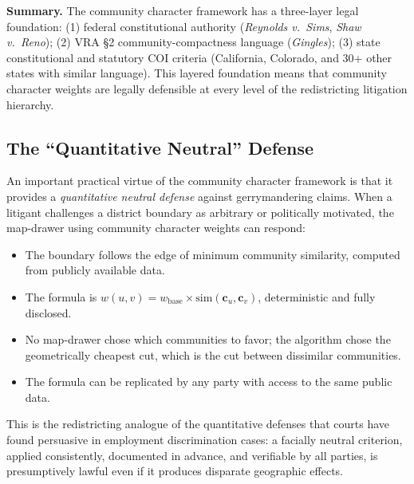 \textbf{Summary.}
The community character framework has a three-layer legal foundation:
(1) federal constitutional authority (\textit{Reynolds v.\ Sims}, \textit{Shaw v.\ Reno});
(2) VRA §2 community-compactness language (\textit{Gingles});
(3) state constitutional and statutory COI criteria (California, Colorado, and 30+
other states with similar language).
This layered foundation means that community character weights are legally defensible
at every level of the redistricting litigation hierarchy.

\subsection{The ``Quantitative Neutral'' Defense}

An important practical virtue of the community character framework is that it provides
a \emph{quantitative neutral defense} against gerrymandering claims.
When a litigant challenges a district boundary as arbitrary or politically motivated,
the map-drawer using community character weights can respond:
\begin{itemize}
  \item The boundary follows the edge of minimum community similarity, computed
    from publicly available data.
  \item The formula is $w(u,v) = w_{\mathrm{base}} \times \mathrm{sim}(\mathbf{c}_u, \mathbf{c}_v)$,
    deterministic and fully disclosed.
  \item No map-drawer chose which communities to favor; the algorithm chose the
    geometrically cheapest cut, which is the cut between dissimilar communities.
  \item The formula can be replicated by any party with access to the same public data.
\end{itemize}
This is the redistricting analogue of the quantitative defenses that courts have
found persuasive in employment discrimination cases: a facially neutral criterion,
applied consistently, documented in advance, and verifiable by all parties,
is presumptively lawful even if it produces disparate geographic effects.
